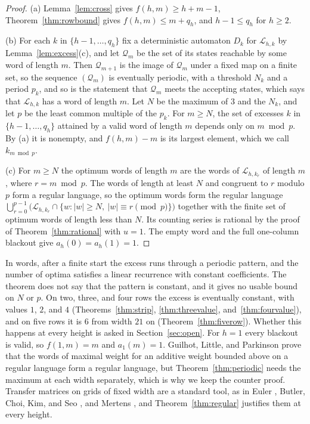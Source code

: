 \begin{proof}
(a) Lemma~\ref{lem:cross} gives $f(h,m)\ge h+m-1$, Theorem~\ref{thm:rowbound} gives $f(h,m)\le m+q_h$, and $h-1\le q_h$ for $h\ge2$.

(b) For each $k$ in $\{h-1,\dots,q_h\}$ fix a deterministic automaton $D_k$ for $\mathcal L_{h,k}$ by Lemma~\ref{lem:excess}(c), and let $\mathcal Q_m$ be the set of its states reachable by some word of length $m$. Then $\mathcal Q_{m+1}$ is the image of $\mathcal Q_m$ under a fixed map on a finite set, so the sequence $(\mathcal Q_m)$ is eventually periodic, with a threshold $N_k$ and a period $p_k$, and so is the statement that $\mathcal Q_m$ meets the accepting states, which says that $\mathcal L_{h,k}$ has a word of length $m$. Let $N$ be the maximum of $3$ and the $N_k$, and let $p$ be the least common multiple of the $p_k$. For $m\ge N$, the set of excesses $k$ in $\{h-1,\dots,q_h\}$ attained by a valid word of length $m$ depends only on $m\bmod p$. By (a) it is nonempty, and $f(h,m)-m$ is its largest element, which we call $k_{m\bmod p}$.

(c) For $m\ge N$ the optimum words of length $m$ are the words of $\mathcal L_{h,k_r}$ of length $m$, where $r=m\bmod p$. The words of length at least $N$ and congruent to $r$ modulo $p$ form a regular language, so the optimum words form the regular language $\bigcup_{r=0}^{p-1}\bigl(\mathcal L_{h,k_r}\cap\{w:|w|\ge N,\ |w|\equiv r\pmod p\}\bigr)$ together with the finite set of optimum words of length less than $N$. Its counting series is rational by the proof of Theorem~\ref{thm:rational} with $u=1$. The empty word and the full one-column blackout give $a_h(0)=a_h(1)=1$.
\end{proof}

In words, after a finite start the excess runs through a periodic pattern, and the number of optima satisfies a linear recurrence with constant coefficients. The theorem does not say that the pattern is constant, and it gives no usable bound on $N$ or $p$. On two, three, and four rows the excess is eventually constant, with values $1$, $2$, and $4$ (Theorems~\ref{thm:strip}, \ref{thm:threevalue}, and~\ref{thm:fourvalue}), and on five rows it is $6$ from width $21$ on (Theorem~\ref{thm:fiverow}). Whether this happens at every height is asked in Section~\ref{sec:open}. For $h=1$ every blackout is valid, so $f(1,m)=m$ and $a_1(m)=1$. Guilhot, Little, and Parkinson \cite[Theorem~1(3)]{glp2025} prove that the words of maximal weight for an additive weight bounded above on a regular language form a regular language, but Theorem~\ref{thm:periodic} needs the maximum at each width separately, which is why we keep the counter proof. Transfer matrices on grids of fixed width are a standard tool, as in Euler \cite{euler2005}, Butler, Choi, Kim, and Seo \cite{butler2019}, and Mertens \cite{mertens2024}, and Theorem~\ref{thm:regular} justifies them at every height.

